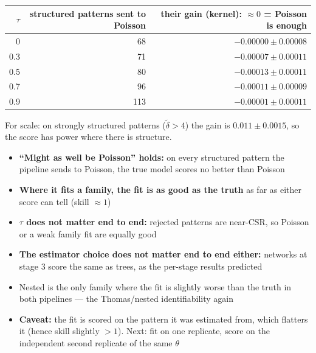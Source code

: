 \documentclass[11pt]{article}
\newcommand{\dt}{\tilde\delta}
\begin{document}
\begin{center}
\begin{tabular}{@{}rrr@{}}
\toprule
$\tau$ & structured patterns sent to Poisson & their gain (kernel): $\approx0$ = Poisson is enough \\
\midrule
0   & 68  & $-0.00000 \pm 0.00008$ \\
0.3 & 71  & $-0.00007 \pm 0.00011$ \\
0.5 & 80  & $-0.00013 \pm 0.00011$ \\
0.7 & 96  & $-0.00011 \pm 0.00009$ \\
0.9 & 113 & $-0.00001 \pm 0.00011$ \\
\bottomrule
\end{tabular}
\end{center}
{\small For scale: on strongly structured patterns ($\dt>4$) the gain is $0.011\pm0.0015$, so the score has power where there is structure.}

\begin{itemize}
  \item \textbf{``Might as well be Poisson'' holds:} on every structured pattern the pipeline sends to Poisson, the true model scores no better than Poisson
  \item \textbf{Where it fits a family, the fit is as good as the truth} as far as either score can tell (skill $\approx1$)
  \item \textbf{$\tau$ does not matter end to end:} rejected patterns are near-CSR, so Poisson or a weak family fit are equally good
  \item \textbf{The estimator choice does not matter end to end either:} networks at stage 3 score the same as trees, as the per-stage results predicted
  \item Nested is the only family where the fit is slightly worse than the truth in both pipelines --- the Thomas/nested identifiability again
  \item \textbf{Caveat:} the fit is scored on the pattern it was estimated from, which flatters it (hence skill slightly $>1$). Next: fit on one replicate, score on the independent second replicate of the same $\theta$
\end{itemize}
\end{document}
